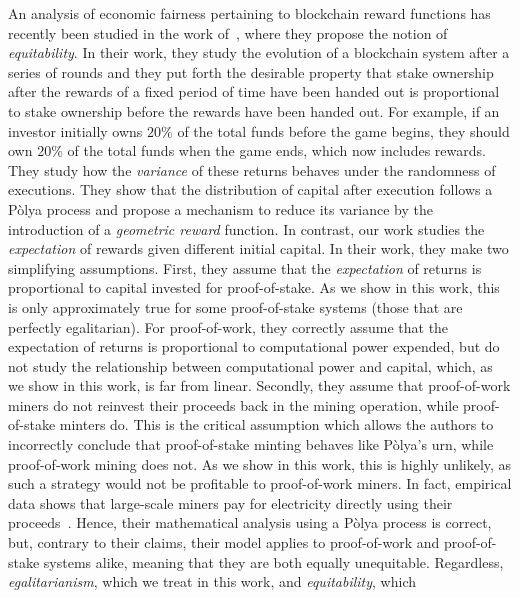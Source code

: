 
An analysis of economic fairness pertaining to blockchain reward functions has recently
been studied in the work of~\cite{equitability}, where they propose the notion
of \emph{equitability}. In their work, they study the evolution of a blockchain system
after a series of rounds and they put forth the desirable property that stake ownership
after the rewards of a fixed period of time have been handed out is proportional
to stake ownership before the rewards have been handed out. For example, if an
investor initially owns $20\%$ of the total funds before the game begins, they
should own $20\%$ of the total funds when the game ends, which now includes
rewards. They study how the \emph{variance} of these returns behaves under the
randomness of executions. They show that the distribution of capital after
execution follows a Pòlya process and propose a mechanism to reduce its
variance by the introduction of a \emph{geometric reward} function.
In contrast, our work studies the \emph{expectation} of rewards given different
initial capital.
In their work, they make two simplifying assumptions.
First, they assume that the \emph{expectation} of returns is proportional to
capital invested for proof-of-stake. As we show in this work, this is only
approximately true for some proof-of-stake systems (those that are perfectly egalitarian). For proof-of-work, they
correctly assume that the expectation of returns is proportional to computational
power expended, but do not study the relationship between computational power and
capital, which, as we show in this work, is far from linear. Secondly, they assume that
proof-of-work miners do not reinvest their proceeds back in the
mining operation, while proof-of-stake minters do. This is the critical assumption which allows the authors to incorrectly
conclude that proof-of-stake minting behaves like Pòlya's urn, while
proof-of-work mining does not. As we show in this work, this
is highly unlikely, as such a strategy would not be profitable to proof-of-work
miners. In fact, empirical data shows that large-scale miners pay for electricity
directly using their proceeds~\cite{is-this-even-true}. Hence, their mathematical analysis
using a Pòlya process is correct, but, contrary to their claims, their model applies to proof-of-work
and proof-of-stake systems alike, meaning that they are both equally unequitable. Regardless,
\emph{egalitarianism}, which we treat in this work, and \emph{equitability}, which
